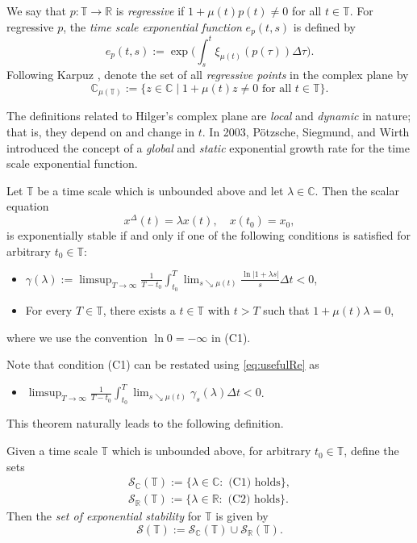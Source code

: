 \documentclass[reqno]{amsart}
\begin{document}
We say that $p:\mathbb{T} \to \mathbb{R}$ is \emph{regressive} if $1+\mu(t)p(t)\not=0$
for all $t\in\mathbb{T}$.
For regressive $p$, the \emph{time scale exponential function} $e_p(t,s)$ is defined by
 \[
 e_{p}(t,s) := \exp\Big(\int_{s}^{t} \xi_{\mu(t)}(p(\tau)) \Delta \tau \Big).
 \]
Following Karpuz \cite{Ka}, denote the set of all \emph{regressive points} in the
complex plane by
$$
\mathbb{C}_{\mu(\mathbb{T})}:=\{z \in \mathbb{C} \mid 1+\mu(t) z \neq 0 \text{ for all } t \in \mathbb{T}\}.
$$

The definitions related to Hilger's complex plane are \emph{local} and \emph{dynamic}
in nature; that is, they depend on and change in $t$. In 2003, P\"{o}tzsche, Siegmund,
 and Wirth introduced the concept of a \emph{global} and \emph{static} exponential
 growth rate for the time scale exponential function.

\begin{theorem}\label{PSW1}
Let $\mathbb{T}$ be a time scale which is unbounded above and let $\lambda
\in \mathbb{C}$. Then the scalar equation
 $$
 x^{\Delta}(t)=\lambda x(t), \quad x(t_0)=x_0,
 $$
is exponentially stable if and
only if one of the following conditions is satisfied for arbitrary
$t_0 \in \mathbb{T}$:
\begin{itemize}
\item[(C1)] $\gamma(\lambda):=  \limsup_{T \to
\infty}\frac{1}{T-t_0}\int_{t_0}^{T}\lim_{s \searrow
\mu(t)} \frac{\ln|1+\lambda s|}{s}\Delta t <0$,

\item[(C2)] For every
$T \in \mathbb{T}$, there exists a $t \in \mathbb{T}$ with $t>T$ such that
$1+\mu(t)\lambda=0$,
\end{itemize}
where we use the convention $\ln 0=-\infty$ in \textup{(C1)}.
\end{theorem}

Note that condition (C1) can be restated using \eqref{eq:usefulRe} as
\begin{itemize}
\item[(C1*)] $ \limsup_{T \to
\infty}\frac{1}{T-t_0}\int_{t_0}^{T}\lim_{s \searrow
\mu(t)} \gamma_s(\lambda) \Delta t <0$.
\end{itemize}
This theorem naturally leads to the following definition.

\begin{definition} \rm
Given a time scale $\mathbb{T}$ which is unbounded above, for
arbitrary $t_0 \in \mathbb{T}$, define the sets
 \begin{gather*}
 \mathcal{S}_{\mathbb{C}}(\mathbb{T}):=\{\lambda \in \mathbb{C}: \text{ (C1) holds}\},\\
 \mathcal{S}_{\mathbb{R}}(\mathbb{T}):=\{\lambda \in \mathbb{R}: \text{ (C2) holds}\}.
 \end{gather*}
Then the \emph{set of exponential stability} for $\mathbb{T}$ is given by
$$
\mathcal{S}(\mathbb{T}):=\mathcal{S}_{\mathbb{C}}(\mathbb{T}) \cup \mathcal{S}_{\mathbb{R}}(\mathbb{T}).
$$
\end{definition}
\end{document}
